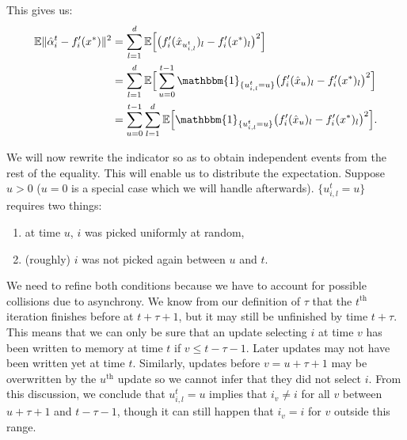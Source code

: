 \documentclass[twoside]{article}
\newcommand{\overlap}{\tau}
\newcommand{\E}{\mathbb{E}}
\newcommand{\ind}{\mathbbm{1}}
\begin{document}
This gives us:
\begin{align}
\E \|\hat \alpha_i^t - f'_i(x^*)\|^2
&= 
\sum_{l=1}^d \E \Big[ \big(f'_{i}(\hat x_{u_{i, l}^t})_l-f'_i(x^*)_l\big)^2 \Big] \notag \\
&=
\sum_{l=1}^d\E \Big[\sum_{u=0}^{t-1} \ind_{\{u_{i, l}^t = u\}} \big(f'_i(\hat x_u)_l-f'_i(x^*)_l\big)^2 \Big] \notag \\
&=
\sum_{u=0}^{t-1} \sum_{l=1}^d\E \Big[\ind_{\{u_{i, l}^t = u\}} \big(f'_i(\hat x_u)_l-f'_i(x^*)_l\big)^2 \Big] 
\label{eq:IndicatorsAppearance}.
\end{align}

We will now rewrite the indicator so as to obtain independent events from the rest of the equality. 
This will enable us to distribute the expectation. 
Suppose $u>0$ ($u=0$ is a special case which we will handle afterwards). $\{u_{i, l}^t = u\}$ requires two things:
\begin{enumerate}
\item at time $u$, $i$ was picked uniformly at random,
\item (roughly) $i$ was not picked again between $u$ and $t$.
\end{enumerate}
We need to refine both conditions because we have to account for possible collisions due to asynchrony. 
We know from our definition of $\overlap$ that the $t^\mathrm{th}$ iteration finishes before at $t + \overlap + 1$, but it may still be unfinished by time $t + \overlap$.
This means that we can only be sure that an update selecting $i$ at time $v$ has been written to memory at time $t$ if $v \leq t -\overlap -1$.
Later updates may not have been written yet at time $t$.
Similarly, updates before $v = u + \overlap +1$ may be overwritten by the $u^\mathrm{th}$ update so we cannot infer that they did not select $i$. From this discussion, we conclude that $u_{i, l}^t = u$ implies that $i_v \neq i$ for all $v$ between $u+\overlap+1$ and $t-\overlap-1$, though it can still happen that $i_v = i$ for $v$ outside this range.
\end{document}
